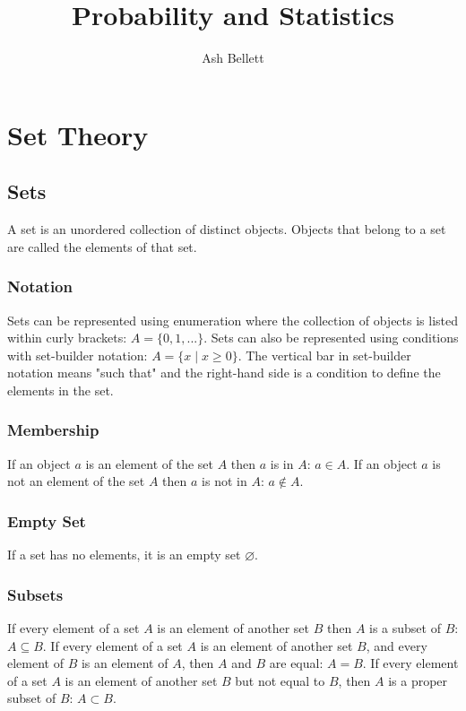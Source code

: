 \documentclass{article}
\title{\textbf{Probability and Statistics}}
\author{Ash Bellett}
\date{}
\begin{document}
\clearpage
\maketitle
\thispagestyle{empty}
\setcounter{page}{0}
\newpage
\tableofcontents
\setcounter{page}{0}
\newpage

\section{Set Theory}

\subsection{Sets}

A set is an unordered collection of distinct objects. Objects that belong to a set are called the elements of that set.

\subsubsection{Notation}

Sets can be represented using enumeration where the collection of objects is listed within curly brackets: $A=\{0, 1, ...\}$. Sets can also be represented using conditions with set-builder notation: $A=\{x \mid x \geq 0\}$. The vertical bar in set-builder notation means "such that" and the right-hand side is a condition to define the elements in the set.

\subsubsection{Membership}

If an object $a$ is an element of the set $A$ then $a$ is in $A$: $a \in A$. If an object $a$ is not an element of the set $A$ then $a$ is not in $A$: $a \notin A$.

\subsubsection{Empty Set}

If a set has no elements, it is an empty set $\varnothing$.

\subsubsection{Subsets}

If every element of a set $A$ is an element of another set $B$ then $A$ is a subset of $B$: $A \subseteq B$. If every element of a set $A$ is an element of another set $B$, and every element of $B$ is an element of $A$, then $A$ and $B$ are equal: $A=B$. If every element of a set $A$ is an element of another set $B$ but not equal to $B$, then $A$ is a proper subset of $B$: $A \subset B$.
\end{document}
